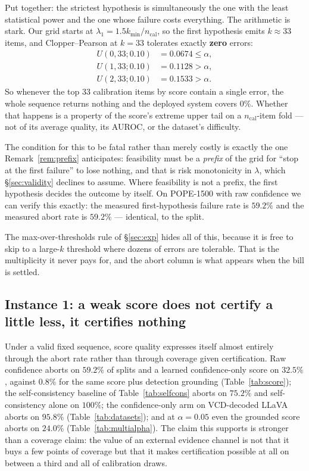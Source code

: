 \documentclass[review,number,doubleblind]{elsarticle}
\theoremstyle{plain}
\theoremstyle{definition}
\theoremstyle{remark}
\begin{document}
Put together: the strictest hypothesis is simultaneously the one with the least statistical power
and the one whose failure costs everything. The arithmetic is stark. Our grid starts at
$\lambda_1=1.5k_{\min}/n_{\mathrm{cal}}$, so the first hypothesis emits $k\approx33$ items, and
Clopper--Pearson at $k=33$ tolerates exactly \textbf{zero} errors:
\begin{align*}
U(0,33;0.10)&=0.0674\le\alpha,\\
U(1,33;0.10)&=0.1128>\alpha,\\
U(2,33;0.10)&=0.1533>\alpha.
\end{align*}
So whenever the top $33$ calibration items by score contain a single error, the whole sequence
returns nothing and the deployed system covers $0\%$. Whether that happens is a property of the
score's extreme upper tail on a $n_{\mathrm{cal}}$-item fold --- not of its average quality, its
AUROC, or the dataset's difficulty.

The condition for this to be fatal rather than merely costly is exactly the one
Remark~\ref{rem:prefix} anticipates: feasibility must be a \emph{prefix} of the grid for
``stop at the first failure'' to lose nothing, and that is risk monotonicity in $\lambda$, which
\S\ref{sec:validity} declines to assume. Where feasibility is not a prefix, the first hypothesis
decides the outcome by itself. On POPE-1500 with raw confidence we can verify this exactly: the
measured first-hypothesis failure rate is $59.2\%$ and the measured abort rate is $59.2\%$ ---
identical, to the split.

The max-over-thresholds rule of \S\ref{sec:exp} hides all of this, because it is free to skip to a
large-$k$ threshold where dozens of errors are tolerable. That is the multiplicity it never pays
for, and the abort column is what appears when the bill is settled.

\subsection{Instance 1: a weak score does not certify a little less, it certifies nothing}

Under a valid fixed sequence, score quality expresses itself almost entirely through the abort
rate rather than through coverage given certification. Raw confidence aborts on $59.2\%$ of
splits and a learned confidence-only score on $32.5\%$, against $0.8\%$ for the same score plus
detection grounding (Table~\ref{tab:score}); the self-consistency baseline of
Table~\ref{tab:selfcons} aborts on $75.2\%$ and self-consistency alone on $100\%$; the
confidence-only arm on VCD-decoded LLaVA aborts on $95.8\%$ (Table~\ref{tab:datasets}); and at
$\alpha=0.05$ even the grounded score aborts on $24.0\%$ (Table~\ref{tab:multialpha}). The claim
this supports is stronger than a coverage claim: the value of an external evidence channel is not
that it buys a few points of coverage but that it makes certification possible at all on between
a third and all of calibration draws.
\end{document}
